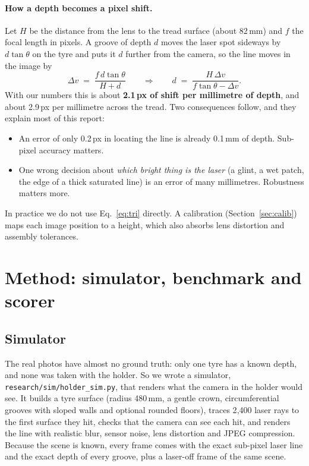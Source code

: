 \paragraph{How a depth becomes a pixel shift.} Let $H$ be the distance from the lens to the tread surface
(about 82\,mm) and $f$ the focal length in pixels. A groove of depth $d$ moves the laser spot sideways by
$d\tan\theta$ on the tyre and puts it $d$ further from the camera, so the line moves in the image by
\begin{equation}
\Delta v \;=\; \frac{f\, d \tan\theta}{H + d}
\qquad\Longrightarrow\qquad
d \;=\; \frac{H\,\Delta v}{f\tan\theta - \Delta v}.
\label{eq:tri}
\end{equation}
With our numbers this is about \textbf{2.1\,px of shift per millimetre of depth}, and about 2.9\,px per millimetre
across the tread. Two consequences follow, and they explain most of this report:
\begin{itemize}
\item An error of only 0.2\,px in locating the line is already 0.1\,mm of depth. Sub-pixel accuracy matters.
\item One wrong decision about \emph{which bright thing is the laser} (a glint, a wet patch, the edge of a thick
      saturated line) is an error of many millimetres. Robustness matters more.
\end{itemize}
In practice we do not use Eq.~\eqref{eq:tri} directly. A calibration (Section~\ref{sec:calib}) maps each image
position to a height, which also absorbs lens distortion and assembly tolerances.

\section{Method: simulator, benchmark and scorer}

\subsection{Simulator}\label{sec:sim}

The real photos have almost no ground truth: only one tyre has a known depth, and none was taken with the holder. So we wrote a simulator,
\texttt{research/sim/holder\_sim.py}, that renders what the camera in the holder would see. It builds a tyre
surface (radius 480\,mm, a gentle crown, circumferential grooves with sloped walls and optional rounded floors),
traces 2{,}400 laser rays to the first surface they hit, checks that the camera can see each hit, and renders the
line with realistic blur, sensor noise, lens distortion and JPEG compression. Because the scene is known, every
frame comes with the exact sub-pixel laser line and the exact depth of every groove, plus a laser-off frame of the
same scene.

